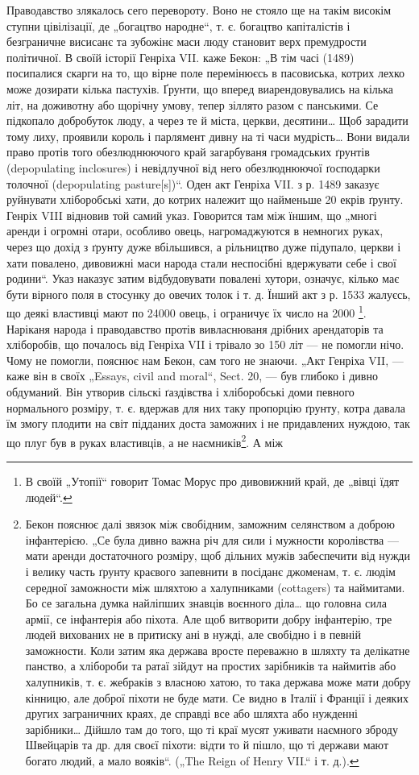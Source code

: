 Праводавство злякалось сего перевороту. Воно не стояло ще на такім високім ступни цівілізації, де
„богацтво народне“, т. є. богацтво капіталістів і безграничне висисанє та зубожінє маси люду
становит верх премудрости
політичної. В своїй історії Генріха VII. каже Бекон: „В тім часі (1489) посипалися скарги на то, що
вірне поле перемінюєсь в пасовиська, котрих лехко може дозирати кілька пастухів. Ґрунти, що вперед
виарендовувались на кілька літ, на доживотну або щорічну умову, тепер зіллято разом
с панськими. Се підкопало добробуток люду, а через те й міста, церкви, десятини\dots{} Щоб зарадити
тому лиху, проявили король і парлямент дивну на ті часи мудрість\dots{} Вони видали право протів того
обезлюднюючого край загарбуваня громадських ґрунтів (depopulating inclosures) і невідлучної
від него обезлюднюючої ґосподарки толочної (depopulating pasture[s])“. Оден акт Генріха VII. з р.
1489 заказує руйнувати хліборобські хати, до котрих належит що найменьше 20 екрів ґрунту. Генріх
VIII відновив той самий указ. Говорится там між їншим, що „многі аренди і огромні отари, особливо
овець, нагромаджуются в немногих руках, через що дохід
з ґрунту дуже вбільшився, а рільництво дуже підупало, церкви і хати повалено, дивовижні маси народа
стали неспосібні вдержувати себе і свої родини“. Указ наказує затим відбудовувати повалені хутори,
означує, кілько має бути вірного поля в стосунку до овечих толок і т. д. Їнший акт з р. 1533
жалуєсь, що деякі властивці мают по 24000 овець, і ограничує їх число на 2000 \footnote{
В своїй „Утопії“ говорит Томас Морус про дивовижний край, де
„вівці їдят людей“.
}. Наріканя народа і
праводавство протів вивласнюваня дрібних арендаторів та хліборобів, що почалось від Генріха VII і
трівало зо 150 літ
— не помогли нічо. Чому не помогли, пояснює нам Бекон, сам того не знаючи. „Акт Генріха VII, — каже
він в своїх „Essays, civil and moral“, Sect. 20, — був глибоко і дивно обдуманий. Він утворив
сільскі ґаздівства і хліборобські доми певного нормального розміру, т. є. вдержав для них таку
пропорцію ґрунту, котра давала їм змогу плодити на світ підданих доста заможних і не придавлених
нуждою, так що плуг був в руках властивців, а не наємників\footnote{
Бекон пояснює далі звязок між свобідним, заможним селянством
а доброю інфантерією. „Се була дивно важна річ для сили і мужности
королівства — мати аренди достаточного розміру, щоб дільних мужів
забеспечити від нужди і велику часть ґрунту краєвого запевнити в посіданє джоменам, т. є. людім
середної заможности між шляхтою а халупниками (cottagers) та наймитами. Бо се загальна думка
найліпших знавців воєнного діла\dots{} що головна сила армії, се інфантерія або піхота. Але щоб
витворити добру інфантерію, тре людей вихованих не в притиску ані в нужді, але свобідно і в певній
заможности. Коли затим яка держава вросте переважно в шляхту та делікатне панство, а хлібороби та
ратаї зійдут на простих зарібників та наймитів або халупників, т. є. жебраків з власною хатою, то
така держава може мати добру кінницю, але доброї піхоти не буде мати. Се видно в Італії і Франції і
деяких других заграничних краях, де справді все або шляхта або нужденні зарібники\dots{} Дійшло там до
того, що ті краї мусят уживати наємного зброду Швейцарів та др. для своєї піхоти: відти то й пішло,
що ті держави мают богато людий, а мало вояків“. („The Reign of   Henry VII.“ і т. д.).
}. А між
\parbreak{}

